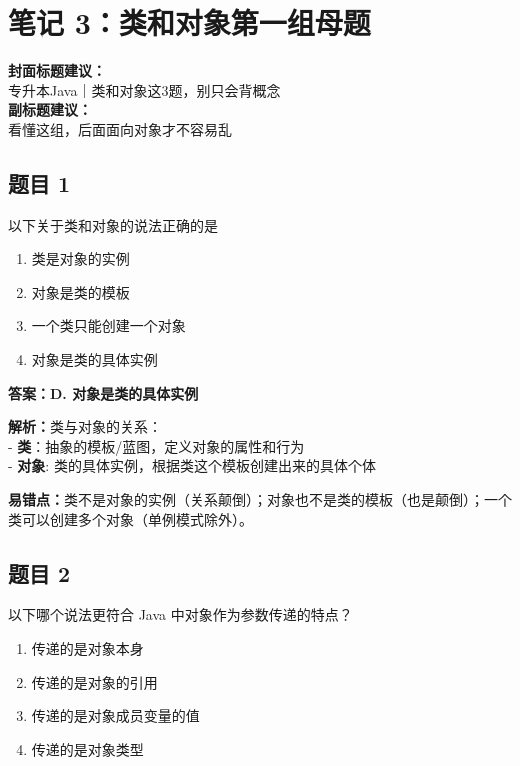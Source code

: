 \documentclass[12pt,a4paper]{ctexart}
\begin{document}
\newpage

\section{笔记 3：类和对象第一组母题}
\begin{coverbox}
	\textbf{封面标题建议：}\\
	专升本Java｜类和对象这3题，别只会背概念\\
	\textbf{副标题建议：}\\
	看懂这组，后面面向对象才不容易乱
\end{coverbox}

\subsection*{题目 1}
以下关于类和对象的说法正确的是
\begin{enumerate}[label=\Alph*.]
	\item 类是对象的实例
	\item 对象是类的模板
	\item 一个类只能创建一个对象
	\item 对象是类的具体实例
\end{enumerate}

\begin{answerbox}
	\textbf{答案：D. 对象是类的具体实例}

	\textbf{解析：}类与对象的关系：\\
	- \textbf{类}：抽象的模板/蓝图，定义对象的属性和行为\\
	- \textbf{对象}: 类的具体实例，根据类这个模板创建出来的具体个体

	\textbf{易错点：}类不是对象的实例（关系颠倒）；对象也不是类的模板（也是颠倒）；一个类可以创建多个对象（单例模式除外）。
\end{answerbox}

\subsection*{题目 2}
以下哪个说法更符合 Java 中对象作为参数传递的特点？
\begin{enumerate}[label=\Alph*.]
	\item 传递的是对象本身
	\item 传递的是对象的引用
	\item 传递的是对象成员变量的值
	\item 传递的是对象类型
\end{enumerate}
\end{document}
